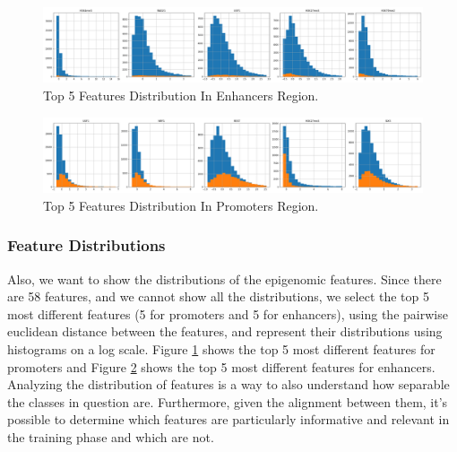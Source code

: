 \documentclass{article}
\begin{document}
\begin{figure}[!ht]
    \centering
    \includegraphics[width=12cm]{image/Top_5_Features_Distribution_Enhancers.PNG}
    \caption{Top 5 Features Distribution In Enhancers Region.}
    \label{fig:Top_Features_Enhancers}
\end{figure}

\begin{figure}[!ht]
    \centering
    \includegraphics[width=12cm]{image/Top_5_Features_Distribution_Promoters.PNG}
    \caption{Top 5 Features Distribution In Promoters Region.}
    \label{fig:Top_Features_Promoters}
\end{figure}

\subsubsection{Feature Distributions}
\label{sec:Feature_Distributions}
\noindent
Also, we want to show the distributions of the epigenomic features. Since there are 58 features, and we cannot show all the distributions, we select the top 5 most different features (5 for promoters and 5 for enhancers), using the pairwise euclidean distance between the features, and represent their distributions using histograms on a log scale. Figure \ref{fig:Top_Features_Enhancers} shows the top 5 most different features for promoters and Figure \ref{fig:Top_Features_Promoters} shows the top 5 most different features for enhancers. Analyzing the distribution of features is a way to also understand how separable the classes in question are. Furthermore, given the alignment between them, it’s possible to determine which features are particularly informative and relevant in the training phase and which are not.
\end{document}
